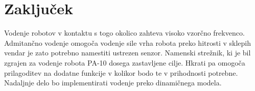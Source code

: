 \documentclass[a4paper]{article}
\begin{document}
\section{Zaključek}

Vodenje robotov v kontaktu s togo okolico zahteva visoko vzorčno frekvenco. Admitančno vodenje omogoča vodenje sile vrha robota preko hitrosti v sklepih vendar je zato potrebno namestiti ustrezen senzor. Namenski strežnik, ki je bil zgrajen za vodenje robota PA-10 dosega zastavljene cilje. Hkrati pa omogoča prilagoditev na dodatne funkcije v kolikor bodo te v prihodnosti potrebne. Nadaljnje delo bo implementirati vodenje preko dinamičnega modela. 

\small



%
%
%
%

	
\end{document}
